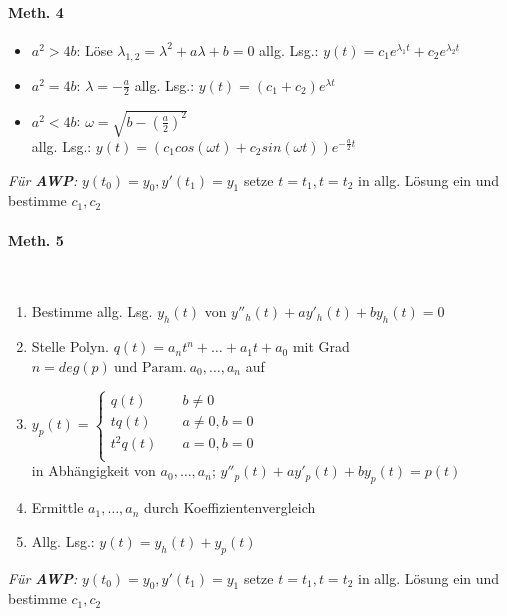 \documentclass[paper=a3,paper=landscape, fontsize=9pt, DIV=30]{scrartcl}
\begin{document}
\begin{multicols*}{4}
  \paragraph{Meth. 4}
  \begin{itemize}
  	\item $a^2>4b$: Löse $\lambda_{1,2}=\lambda^2+a\lambda + b = 0$
  	allg. Lsg.: $y(t)=c_1e^{\lambda_1t}+c_2e^{\lambda_2t}$
  	\item $a^2=4b$: $\lambda = - \frac{a}{2}$
  	allg. Lsg.: $y(t)=(c_1+c_2)e^{\lambda t}$
  	\item $a^2<4b$: $\omega = \sqrt{b - (\frac{a}{2})^2}$\\
  	allg. Lsg.: $y(t)=(c_1cos(\omega t) + c_2sin(\omega t))e^{-\frac{a}{2}t}$
  \end{itemize}
\textit{Für \textbf{AWP}:} $y(t_0)=y_0, y'(t_1)=y_1$ setze $t=t_1, t=t_2$ in allg. Lösung ein und bestimme $c_1,c_2$

  \paragraph{Meth. 5}\hspace{0pt}\\
  \begin{enumerate}
  	\item Bestimme allg. Lsg. $y_h(t)$ von $y''_h(t)+ay'_h(t)+by_h(t)=0$
  	\item Stelle Polyn. $q(t)=a_nt^n+\dots+a_1t+a_0$ mit Grad $n=deg(p) \ \text{und Param.}\ a_0,\dots,a_n$ auf
  	\item $y_p(t) =
  	\begin{cases}
  		q(t)    & \quad b \neq 0 \\
  		tq(t)   & \quad a \neq 0, b = 0\\
  		t^2q(t) & \quad a = 0, b = 0\\
  	\end{cases}
  	$\\
  in Abhängigkeit von $a_0,\dots ,a_n$;
  $y''_p(t)+ay'_p(t)+by_p(t)=p(t)$
 \item Ermittle $a_1,\dots,a_n$ durch Koeffizientenvergleich
 \item Allg. Lsg.: $y(t)=y_h(t)+y_p(t)$
  \end{enumerate}
  \textit{Für \textbf{AWP}:} $y(t_0)=y_0, y'(t_1)=y_1$ setze $t=t_1, t=t_2$ in allg. Lösung ein und bestimme $c_1,c_2$


\end{multicols*}
\end{document}
